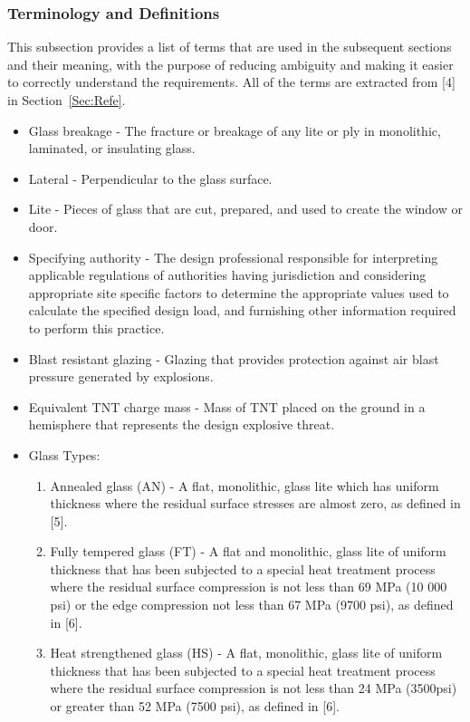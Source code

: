\documentclass[12pt]{article}
\begin{document}
\subsubsection{Terminology and Definitions}
\label{Sec:TermandDefi}
This subsection provides a list of terms that are used in the subsequent sections and their meaning, with the purpose of reducing ambiguity and making it easier to correctly understand the requirements. All of the terms are extracted from [4] in Section~\ref{Sec:Refe}.
\begin{itemize}
\item{Glass breakage - The fracture or breakage of any lite or ply in monolithic, laminated, or insulating glass.}
\item{Lateral - Perpendicular to the glass surface.}
\item{Lite - Pieces of glass that are cut, prepared, and used to create the window or door.}
\item{Specifying authority - The design professional responsible for interpreting applicable regulations of authorities having jurisdiction and considering appropriate site specific factors to determine the appropriate values used to calculate the specified design load, and furnishing other information required to perform this practice.}
\item{Blast resistant glazing - Glazing that provides protection against air blast pressure generated by explosions.}
\item{Equivalent TNT charge mass - Mass of TNT placed on the ground in a hemisphere that represents the design explosive threat.}
\item{Glass Types:}
\begin{enumerate}
\item{Annealed glass (AN) - A flat, monolithic, glass lite which has uniform thickness where the residual surface stresses are almost zero, as defined in [5].}
\item{Fully tempered glass (FT) - A flat and monolithic, glass lite of uniform thickness that has been subjected to a special heat treatment process where the residual surface compression is not less than 69 MPa (10 000 psi) or the edge compression not less than 67 MPa (9700 psi), as defined in [6].}
\item{Heat strengthened glass (HS) - A flat, monolithic, glass lite of uniform thickness that has been subjected to a special heat treatment process where the residual surface compression is not less than 24 MPa (3500psi) or greater than 52 MPa (7500 psi), as defined in [6].}

\end{enumerate}
\end{itemize}
\end{document}
